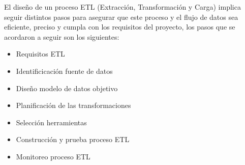 El diseño de un proceso ETL (Extracción, Transformación y Carga) implica seguir distintos pasos para asegurar que este proceso y el flujo de datos sea eficiente, preciso y cumpla con los requisitos del proyecto, los pasos que se acordaron a seguir son los siguientes:
\begin{itemize}
    \item Requisitos ETL
    \item Identificicación fuente de datos
    \item Diseño modelo de datos objetivo
    \item Planificación de las transformaciones
    \item Selección herramientas
    \item Construcción y prueba proceso ETL
    \item Monitoreo proceso ETL
\end{itemize}
